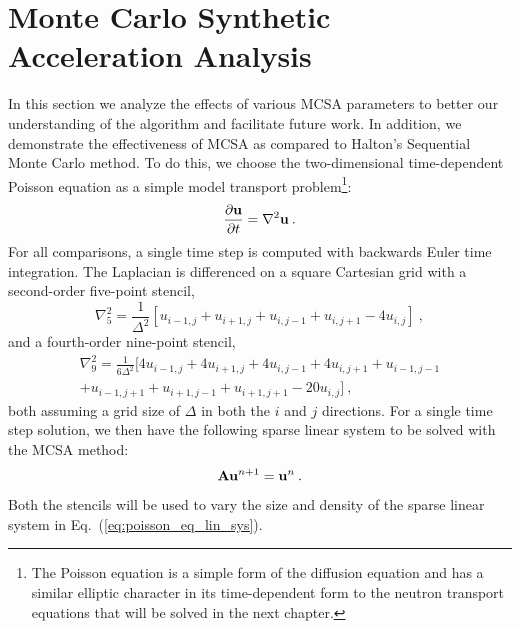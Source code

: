 \section{Monte Carlo Synthetic Acceleration Analysis}
\label{sec:mcsa_analysis}
In this section we analyze the effects of various MCSA parameters to
better our understanding of the algorithm and facilitate future
work. In addition, we demonstrate the effectiveness of MCSA as
compared to Halton's Sequential Monte Carlo method. To do this, we
choose the two-dimensional time-dependent Poisson equation as a simple
model transport problem\footnote{The Poisson equation is a simple form
  of the diffusion equation and has a similar elliptic character in
  its time-dependent form to the neutron transport equations that will
  be solved in the next chapter.}:
\begin{equation}
  \frac{\partial \mathbf{u}}{\partial t} = \nabla^2 \mathbf{u}\:.
  \label{eq:poisson_equation}
\end{equation}
For all comparisons, a single time step is computed with backwards Euler time
integration. The Laplacian is differenced on a square Cartesian grid with a
second-order five-point stencil,
\begin{equation}
  \nabla^2_5 = \frac{1}{\Delta^2}[u_{i-1,j} + u_{i+1,j} + u_{i,j-1} +
    u_{i,j+1} - 4 u_{i,j}]\:,
  \label{eq:five_point_stencil}
\end{equation}
and a fourth-order nine-point stencil,
\begin{multline}
  \nabla^2_9 = \frac{1}{6\Delta^2}[4 u_{i-1,j} + 4 u_{i+1,j} + 4
    u_{i,j-1} + 4 u_{i,j+1} + u_{i-1,j-1}\\ + u_{i-1,j+1} +
    u_{i+1,j-1} + u_{i+1,j+1} - 20 u_{i,j}]\:,
  \label{eq:nine_point_stencil}
\end{multline}
both assuming a grid size of $\Delta$ in both the $i$ and $j$ directions. For
a single time step solution, we then have the following sparse linear system
to be solved with the MCSA method:
\begin{equation}
  \mathbf{A} \mathbf{u}^{n+1} = \mathbf{u}^n\:.
  \label{eq:poisson_eq_lin_sys}
\end{equation}
Both the stencils will be used to vary the size and density of the sparse
linear system in Eq.~(\ref{eq:poisson_eq_lin_sys}).

